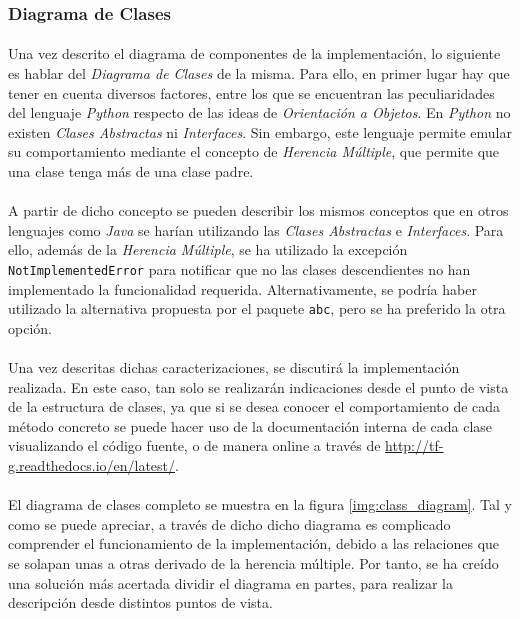 \documentclass{subfiles}
\begin{document}
        \subsubsection{Diagrama de Clases}
        \label{sec:class_diagram}

          \paragraph{}
          Una vez descrito el diagrama de componentes de la implementación, lo siguiente es hablar del \emph{Diagrama de Clases} de la misma. Para ello, en primer lugar hay que tener en cuenta diversos factores, entre los que se encuentran las peculiaridades del lenguaje \emph{Python} respecto de las ideas de \emph{Orientación a Objetos}. En \emph{Python} no existen \emph{Clases Abstractas} ni \emph{Interfaces}. Sin embargo, este lenguaje permite emular su comportamiento mediante el concepto de \emph{Herencia Múltiple}, que permite que una clase tenga más de una clase padre.

          \paragraph{}
          A partir de dicho concepto se pueden describir los mismos conceptos que en otros lenguajes como \emph{Java} se harían utilizando las \emph{Clases Abstractas} e \emph{Interfaces}. Para ello, además de la \emph{Herencia Múltiple}, se ha utilizado la excepción \texttt{NotImplementedError} para notificar que no las clases descendientes no han implementado la funcionalidad requerida. Alternativamente, se podría haber utilizado la alternativa propuesta por el paquete \texttt{abc}, pero se ha preferido la otra opción.

          \paragraph{}
          Una vez descritas dichas caracterizaciones, se discutirá la implementación realizada. En este caso, tan solo se realizarán indicaciones desde el punto de vista de la estructura de clases, ya que si se desea conocer el comportamiento de cada método concreto se puede hacer uso de la documentación interna de cada clase visualizando el código fuente, o de manera online a través de \url{http://tf-g.readthedocs.io/en/latest/}.

          \paragraph{}
          El diagrama de clases completo se muestra en la figura \ref{img:class_diagram}. Tal y como se puede apreciar, a través de dicho dicho diagrama es complicado comprender el funcionamiento de la implementación, debido a las relaciones que se solapan unas a otras derivado de la herencia múltiple. Por tanto, se ha creído una solución más acertada dividir el diagrama en partes, para realizar la descripción desde distintos puntos de vista.
\end{document}
